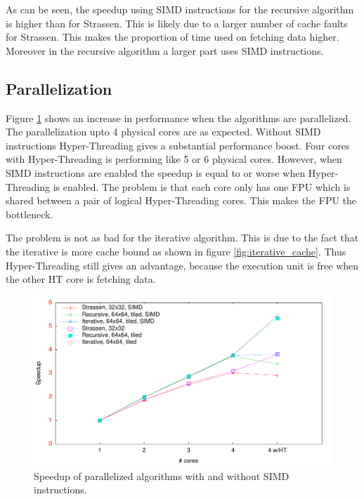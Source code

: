 As can be seen, the speedup using SIMD instructions for the recursive algorithm is higher than for Strassen. This is likely due to a larger number of cache faults for Strassen. This makes the proportion of time used on fetching data higher. Moreover in the recursive algorithm a larger part uses SIMD instructions.

\subsection{Parallelization}

Figure \ref{fig:parallel_speedup} shows an increase in performance when the algorithms are parallelized. The parallelization upto 4 physical cores are as expected. Without SIMD instructions Hyper-Threading gives a substantial performance boost. Four cores with Hyper-Threading is performing like 5 or 6 physical cores. However, when SIMD instructions are enabled the speedup is equal to or worse when Hyper-Threading is enabled. The problem is that each core only has one FPU \cite{IntelHT} which is shared between a pair of logical Hyper-Threading cores. This makes the FPU the bottleneck.

The problem is not as bad for the iterative algorithm. This is due to the fact that the iterative is more cache bound as shown in figure \ref{fig:iterative_cache}. Thus Hyper-Threading still gives an advantage, because the execution unit is free when the other HT core is fetching data.

\begin{figure}[h!]
  \centering
  \includegraphics[width=\textwidth]{"../project2/gnuplots/parallel_speedup"}
  \caption{Speedup of parallelized algorithms with and without SIMD instructions.}
  \label{fig:parallel_speedup}
\end{figure}

